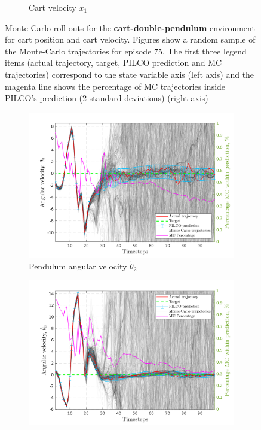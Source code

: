 \begin{figure}[htp!]
\begin{subfigure}[b]{1\linewidth}
    \caption{Cart velocity $\dot{x}_1$} 
    \label{Fig:Re-cdp-cart-velocity} 
  \end{subfigure} 
\caption[Monte-Carlo roll outs for \textbf{cart-double-pendulum} cart position and cart velocity]{Monte-Carlo roll outs for the \textbf{cart-double-pendulum} environment for cart position and cart velocity. Figures show a random sample of the Monte-Carlo trajectories for episode 75. The first three legend items (actual trajectory, target, PILCO prediction and MC trajectories) correspond to the state variable axis (left axis) and the magenta line shows the percentage of MC trajectories inside PILCO's prediction (2 standard deviations) (right axis)}
\label{Re:cdp-MC-roll-outs-1} 
\end{figure}
 
 
\begin{figure}[htp!]    
   \begin{subfigure}[b]{1\linewidth}
    \centering
    \includegraphics[height=0.4\textheight,width=1\textwidth]{Chapter3/Figures/cdp_MC_rollout_Ep_75_Dim_3.png} 
    \caption{Pendulum angular velocity $\dot{\theta}_2$} 
    \label{Fig:Re-cdp-pen2-velocity} 
  \end{subfigure} 
  \hspace{\fill}
  \begin{subfigure}[b]{1\linewidth}
    \centering
    \includegraphics[height=0.4\textheight,width=1\textwidth]{Chapter3/Figures/cdp_MC_rollout_Ep_75_Dim_4.png} 

\end{subfigure}
\end{figure}
